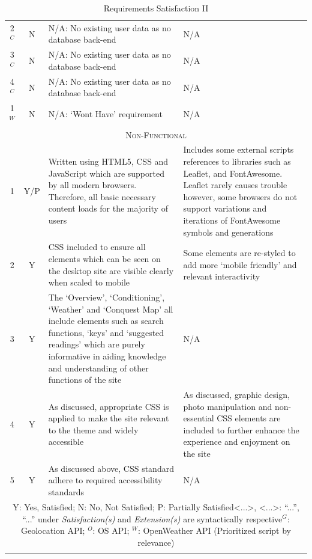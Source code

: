 \documentclass[11pt, english]{article}
\begin{document}
\begin{center}
\begin{longtable}{ccp{5.5cm}p{5.5cm}}
		2$^C$ & N & N/A: No existing user data as no database back-end & N/A\\
		3$^C$ & N & N/A: No existing user data as no database back-end & N/A\\
		4$^C$ & N & N/A: No existing user data as no database back-end & N/A\\
		1$^W$ & N & N/A: `Wont Have' requirement & N/A\\
		\hline
		\multicolumn{4}{c}{\textsc{Non-Functional}}\\
		\hline
		1 & Y/P & Written using HTML5, CSS and JavaScript which are supported by all modern browsers. Therefore, all basic necessary content loads for the majority of users & Includes some external scripts references to libraries such as Leaflet, and FontAwesome. Leaflet rarely causes trouble however, some browsers do not support variations and iterations of FontAwesome symbols and generations\\
		2 & Y & CSS included to ensure all elements which can be seen on the desktop site are visible clearly when scaled to mobile & Some elements are re-styled to add more `mobile friendly' and relevant interactivity\\
		3 & Y & The `Overview', `Conditioning', `Weather' and `Conquest Map' all include elements such as search functions, `keys' and `suggested readings' which are purely informative in aiding knowledge and understanding of other functions of the site & N/A\\
		4 & Y & As discussed, appropriate CSS is applied to make the site relevant to the theme and widely accessible & As discussed, graphic design, photo manipulation and non-essential CSS elements are included to further enhance the experience and enjoyment on the site\\
		5 & Y & As discussed above, CSS standard adhere to required accessibility standards & N/A\\
		\hline
		\multicolumn{4}{p{12cm}}{Y: Yes, Satisfied; N: No, Not Satisfied; P: Partially Satisfied\newline <...>, <...>: ``...'', ``...'' under \textit{Satisfaction(s)} and \textit{Extension(s)} are syntactically respective\newline $^G$: Geolocation API; $^O$: OS API; $^W$: OpenWeather API (Prioritized script by relevance)}\\
		\hline
		\caption{Requirements Satisfaction II}
	\end{longtable}
	\end{center}
\end{document}

